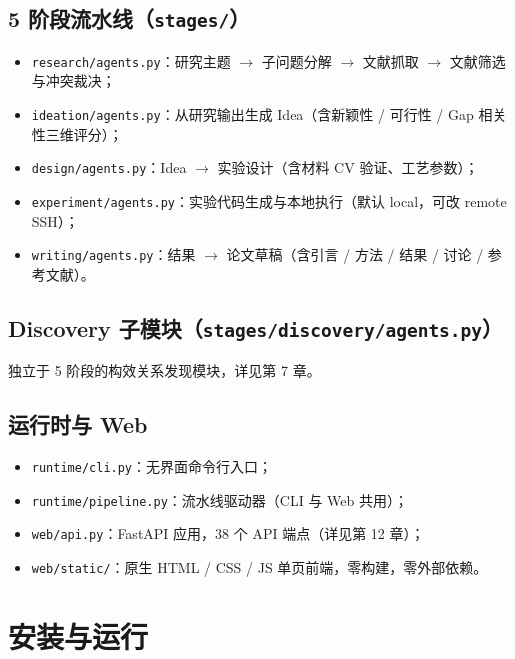 \documentclass[11pt,a4paper]{article}
\begin{document}
\subsection{5 阶段流水线（\texttt{stages/}）}

\begin{itemize}[leftmargin=2em]
\item \texttt{research/agents.py}：研究主题 $\to$ 子问题分解 $\to$ 文献抓取 $\to$ 文献筛选与冲突裁决；
\item \texttt{ideation/agents.py}：从研究输出生成 Idea（含新颖性 / 可行性 / Gap 相关性三维评分）；
\item \texttt{design/agents.py}：Idea $\to$ 实验设计（含材料 CV 验证、工艺参数）；
\item \texttt{experiment/agents.py}：实验代码生成与本地执行（默认 local，可改 remote SSH）；
\item \texttt{writing/agents.py}：结果 $\to$ 论文草稿（含引言 / 方法 / 结果 / 讨论 / 参考文献）。
\end{itemize}

\subsection{Discovery 子模块（\texttt{stages/discovery/agents.py}）}

独立于 5 阶段的构效关系发现模块，详见第 7 章。

\subsection{运行时与 Web}

\begin{itemize}[leftmargin=2em]
\item \texttt{runtime/cli.py}：无界面命令行入口；
\item \texttt{runtime/pipeline.py}：流水线驱动器（CLI 与 Web 共用）；
\item \texttt{web/api.py}：FastAPI 应用，38 个 API 端点（详见第 12 章）；
\item \texttt{web/static/}：原生 HTML / CSS / JS 单页前端，零构建，零外部依赖。
\end{itemize}

\section{安装与运行}
\end{document}
